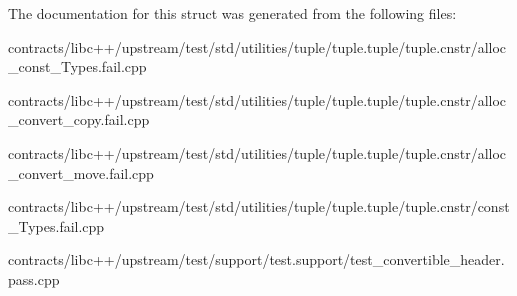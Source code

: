The documentation for this struct was generated from the following files\+:\begin{DoxyCompactItemize}
\item 
contracts/libc++/upstream/test/std/utilities/tuple/tuple.\+tuple/tuple.\+cnstr/alloc\+\_\+const\+\_\+\+Types.\+fail.\+cpp\item 
contracts/libc++/upstream/test/std/utilities/tuple/tuple.\+tuple/tuple.\+cnstr/alloc\+\_\+convert\+\_\+copy.\+fail.\+cpp\item 
contracts/libc++/upstream/test/std/utilities/tuple/tuple.\+tuple/tuple.\+cnstr/alloc\+\_\+convert\+\_\+move.\+fail.\+cpp\item 
contracts/libc++/upstream/test/std/utilities/tuple/tuple.\+tuple/tuple.\+cnstr/const\+\_\+\+Types.\+fail.\+cpp\item 
contracts/libc++/upstream/test/support/test.\+support/test\+\_\+convertible\+\_\+header.\+pass.\+cpp\end{DoxyCompactItemize}
